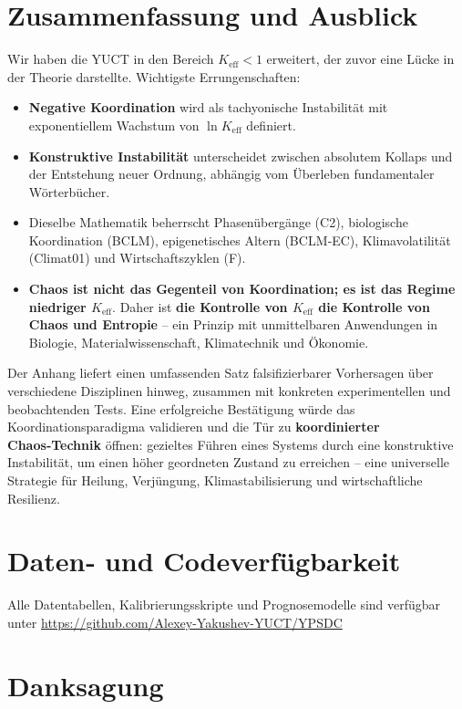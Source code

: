 \documentclass[12pt,a4paper]{article}
\newcommand{\Keff}{K_{\mathrm{eff}}}
\begin{document}
	\section{Zusammenfassung und Ausblick}
	
	Wir haben die YUCT in den Bereich $\Keff < 1$ erweitert, der zuvor eine Lücke in der Theorie darstellte.
	Wichtigste Errungenschaften:
	
	\begin{itemize}
		\item \textbf{Negative Koordination} wird als tachyonische Instabilität mit exponentiellem Wachstum
		von $\ln \Keff$ definiert.
		\item \textbf{Konstruktive Instabilität} unterscheidet zwischen absolutem Kollaps und der Entstehung
		neuer Ordnung, abhängig vom Überleben fundamentaler Wörterbücher.
		\item Dieselbe Mathematik beherrscht Phasenübergänge (C2), biologische Koordination (BCLM),
		epigenetisches Altern (BCLM‑EC), Klimavolatilität (Climat01) und Wirtschaftszyklen (F).
		\item \textbf{Chaos ist nicht das Gegenteil von Koordination; es ist das Regime niedriger $\Keff$}.
		Daher ist \textbf{die Kontrolle von $\Keff$ die Kontrolle von Chaos und Entropie} – ein Prinzip
		mit unmittelbaren Anwendungen in Biologie, Materialwissenschaft, Klimatechnik und Ökonomie.
	\end{itemize}
	
	Der Anhang liefert einen umfassenden Satz falsifizierbarer Vorhersagen über verschiedene Disziplinen
	hinweg, zusammen mit konkreten experimentellen und beobachtenden Tests. Eine erfolgreiche Bestätigung
	würde das Koordinationsparadigma validieren und die Tür zu \textbf{koordinierter Chaos‑Technik} öffnen:
	gezieltes Führen eines Systems durch eine konstruktive Instabilität, um einen höher geordneten Zustand
	zu erreichen – eine universelle Strategie für Heilung, Verjüngung, Klimastabilisierung und wirtschaftliche Resilienz.
	
	\section*{Daten‑ und Codeverfügbarkeit}
	
	Alle Datentabellen, Kalibrierungsskripte und Prognosemodelle sind verfügbar unter
	\url{https://github.com/Alexey-Yakushev-YUCT/YPSDC}
	
	\section*{Danksagung}
	
\end{document}
